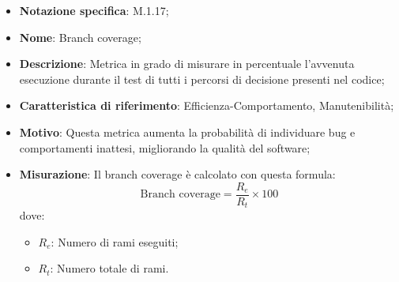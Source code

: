 \begin{itemize}
    \item \textbf{Notazione specifica}: M.1.17;
    \item \textbf{Nome}: Branch coverage;
    \item \textbf{Descrizione}: Metrica in grado di misurare in percentuale l'avvenuta esecuzione durante il test di tutti i percorsi di decisione presenti nel codice;
    \item \textbf{Caratteristica di riferimento}: Efficienza-Comportamento, Manutenibilità;
    \item \textbf{Motivo}: Questa metrica aumenta la probabilità di individuare bug e comportamenti inattesi, migliorando la qualità del software;
    \item \textbf{Misurazione}: Il branch coverage è calcolato con questa formula:
    \[
        \text{Branch coverage} = \frac{R_{e}}{R_{t}} \times 100
    \]
    dove:
    \begin{itemize}
        \item $R_{e}$: Numero di rami eseguiti;
        \item $R_{t}$: Numero totale di rami.
    \end{itemize}

\end{itemize}